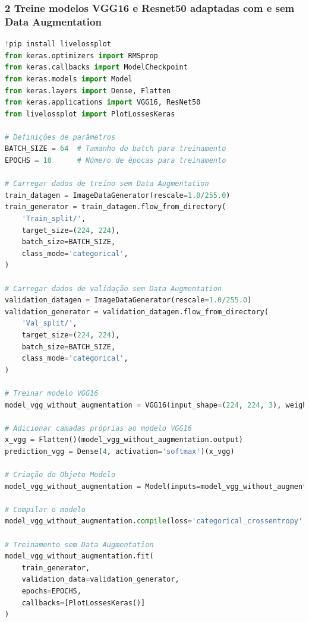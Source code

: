 \subsubsection*{2 Treine modelos VGG16 e Resnet50 adaptadas com e sem Data Augmentation}
\begin{lstlisting}[language=Python, style=input]
!pip install livelossplot
from keras.optimizers import RMSprop
from keras.callbacks import ModelCheckpoint
from keras.models import Model
from keras.layers import Dense, Flatten
from keras.applications import VGG16, ResNet50
from livelossplot import PlotLossesKeras

# Definições de parâmetros
BATCH_SIZE = 64  # Tamanho do batch para treinamento
EPOCHS = 10      # Número de épocas para treinamento

# Carregar dados de treino sem Data Augmentation
train_datagen = ImageDataGenerator(rescale=1.0/255.0)
train_generator = train_datagen.flow_from_directory(
    'Train_split/',
    target_size=(224, 224),
    batch_size=BATCH_SIZE,
    class_mode='categorical',
)

# Carregar dados de validação sem Data Augmentation
validation_datagen = ImageDataGenerator(rescale=1.0/255.0)
validation_generator = validation_datagen.flow_from_directory(
    'Val_split/',
    target_size=(224, 224),
    batch_size=BATCH_SIZE,
    class_mode='categorical',
)

# Treinar modelo VGG16
model_vgg_without_augmentation = VGG16(input_shape=(224, 224, 3), weights='imagenet', include_top=False)  # Use o modelo pré-treinado

# Adicionar camadas próprias ao modelo VGG16
x_vgg = Flatten()(model_vgg_without_augmentation.output)
prediction_vgg = Dense(4, activation='softmax')(x_vgg)

# Criação do Objeto Modelo
model_vgg_without_augmentation = Model(inputs=model_vgg_without_augmentation.input, outputs=prediction_vgg)

# Compilar o modelo
model_vgg_without_augmentation.compile(loss='categorical_crossentropy', optimizer=RMSprop(learning_rate=0.0001), metrics=['accuracy'])

# Treinamento sem Data Augmentation
model_vgg_without_augmentation.fit(
    train_generator,
    validation_data=validation_generator,
    epochs=EPOCHS,
    callbacks=[PlotLossesKeras()]
)
\end{lstlisting}
